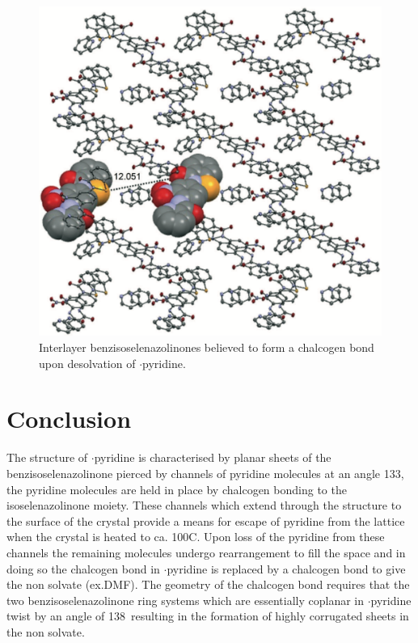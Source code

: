 \begin{refsection}
\begin{figure}
    \centering
    \includegraphics[width=0.8\linewidth]{Figures/ebs-nitroamide-2py-transformation.pdf}
    \caption[Rearrangement of Ch-bonds upon desolvation.]{Interlayer benzisoselenazolinones  believed to form a  chalcogen bond upon desolvation of $\cdot$pyridine.}\label{fig:ebs-nitroamide-2py-transformation}
\end{figure}

\section{Conclusion}
The structure of $\cdot$pyridine is characterised by planar sheets of the benzisoselenazolinone  pierced by channels of pyridine molecules at an angle 133\degree, the pyridine molecules are held in place by  chalcogen bonding to the isoselenazolinone moiety.
These channels which extend through the structure to the surface of the crystal provide a means for escape of pyridine from the lattice when the crystal is heated to ca. 100\degree{}C.
Upon loss of the pyridine from these channels the remaining molecules undergo rearrangement to fill the space and in doing so the  chalcogen bond in $\cdot$pyridine is replaced by a  chalcogen bond to give the non solvate (ex.DMF).
The geometry of the chalcogen bond requires that the two benzisoselenazolinone ring systems which are essentially coplanar in $\cdot$pyridine twist by an angle of 138\degree~resulting in the formation of highly corrugated sheets in the non solvate.


\end{refsection}
